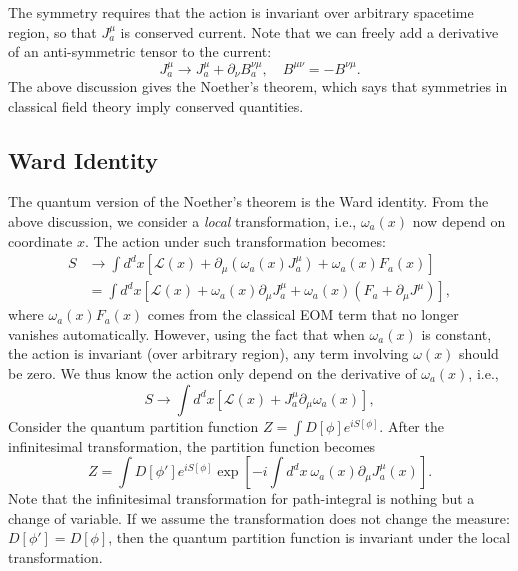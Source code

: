 \documentclass[aps,prb,superscriptaddress,nofootinbib]{revtex4}
\begin{document}
The symmetry requires that the action is invariant over arbitrary spacetime region, so that $J_a^\mu$ is conserved current.
Note that we can freely add a derivative of an anti-symmetric tensor to the current:
\begin{equation}
	J^\mu_a \rightarrow J^\mu_a + \partial_\nu B^{\nu\mu}_a,\quad
	B^{\mu\nu} = -B^{\nu\mu}.
\end{equation}
The above discussion gives the Noether's theorem, which says that symmetries in classical field theory imply conserved quantities.

\subsection{Ward Identity}
The quantum version of the Noether's theorem is the Ward identity.
From the above discussion, we consider a \textit{local} transformation, i.e., $\omega_a(x)$ now depend on coordinate $x$.
The action under such transformation becomes:
\begin{equation}
\begin{aligned}
	S &\rightarrow \int d^d x \left[\mathcal L(x) + \partial_\mu\left( \omega_a(x) J_a^\mu \right) + \omega_a(x) F_a(x)\right] \\
	&= \int d^d x \left[\mathcal L(x) + \omega_a(x) \partial_\mu J_a^\mu + \omega_a(x) (F_a+\partial_\mu J^\mu)\right],
\end{aligned}
\end{equation}
where $\omega_a(x) F_a(x)$ comes from the classical EOM term that no longer vanishes automatically.
However, using the fact that when $\omega_a(x)$ is constant, the action is invariant (over arbitrary region), any term involving $\omega(x)$ should be zero. 
We thus know the action only depend on the derivative of $\omega_a(x)$, i.e.,
\begin{equation}
	S \rightarrow \int d^d x \left[\mathcal L(x) + J_a^\mu \partial_\mu \omega_a(x)  \right],
\end{equation}
Consider the quantum partition function $Z = \int D[\phi] e^{iS[\phi]}$.
After the infinitesimal transformation, the partition function becomes
\begin{equation}
	Z = \int D[\phi'] e^{iS[\phi]} \exp\left[-i\int d^d x \ \omega_a(x) \partial_\mu J_a^\mu (x)\right].
\end{equation}
Note that the infinitesimal transformation for path-integral is nothing but a change of variable.
If we assume the transformation does not change the measure: $D[\phi'] = D[\phi]$, then the quantum partition function is invariant under the local transformation.
\end{document}
